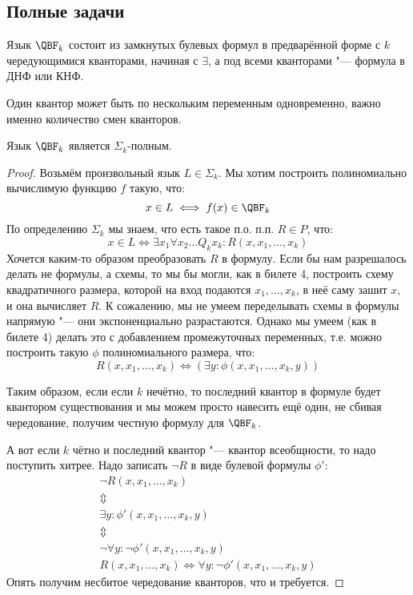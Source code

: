 \subsection{Полные задачи}
	\begin{Def}
		Язык $\QBF_k$ состоит из замкнутых булевых формул в предварённой форме с $k$ чередующимися кванторами, начиная с $\exists$,
		а под всеми кванторами "--- формула в ДНФ или КНФ.
	\end{Def}
	\begin{Rem}
		Один квантор может быть по нескольким переменным одновременно, важно именно количество смен кванторов.
	\end{Rem}
	\begin{assertion}
		Язык $\QBF_k$ является $\Sigma_k$-полным.
	\end{assertion}
	\begin{proof}
		Возьмём произвольный язык $L \in \Sigma_k$.
		Мы хотим построить полиномиально вычислимую функцию $f$ такую, что:
		\[ x \in L \iff f(x) \in \QBF_k \]
		По определению $\Sigma_k$ мы знаем, что есть такое п.о. п.п. $R \in P$, что:
		\[ x \in L \iff \exists x_1 \forall x_2 \dots Q_k x_k \colon R(x, x_1, \dots, x_k) \]
		Хочется каким-то образом преобразовать $R$ в формулу.
		Если бы нам разрешалось делать не формулы, а схемы, то мы бы могли, как в билете 4, построить схему квадратичного размера,
		которой на вход подаются $x_1, \dots, x_k$, в неё саму зашит $x$, и она вычисляет $R$.
		К сожалению, мы не умеем переделывать схемы в формулы напрямую "--- они экспоненциально разрастаются.
		Однако мы умеем (как в билете 4) делать это с добавлением промежуточных переменных, т.е. можно построить такую $\phi$ полиномиального размера, что:
		\[ R(x, x_1, \dots, x_k) \iff (\exists y \colon \phi(x, x_1, \dots, x_k, y)) \]

		Таким образом, если если $k$ нечётно, то последний квантор в формуле будет квантором существования и мы можем просто навесить ещё один,
		не сбивая чередование, получим честную формулу для $\QBF_k$.

		А вот если $k$ чётно и последний квантор "--- квантор всеобщности, то надо поступить хитрее.
		Надо записать $\lnot R$ в виде булевой формулы $\phi'$:
		\begin{gather*}
			\lnot R(x, x_1, \dots, x_k) \\
			\Updownarrow \\
			\exists y \colon \phi'(x, x_1, \dots, x_k, y) \\
			\Updownarrow \\
			\lnot \forall y \colon \lnot \phi'(x, x_1, \dots, x_k, y) \\
			R(x, x_1, \dots, x_k) \iff \forall y \colon \lnot \phi'(x, x_1, \dots, x_k, y)
		\end{gather*}
		Опять получим несбитое чередование кванторов, что и требуется.
	\end{proof}


